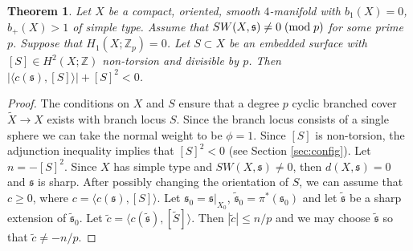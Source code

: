 \documentclass{amsart}
\newtheorem{theorem}{Theorem}[section]
\theoremstyle{definition}
\theoremstyle{remark}
\numberwithin{equation}{section}
\begin{document}
\begin{theorem}\label{thm:1sad}
Let $X$ be a compact, oriented, smooth $4$-manifold with $b_1(X) = 0$, $b_+(X) > 1$ of simple type. Assume that $SW(X , \mathfrak{s}) \neq 0 \; ({\rm mod} \; p)$ for some prime $p$. Suppose that $H_1(X ; \mathbb{Z}_p) = 0$. Let $S \subset X$ be an embedded surface with $[S] \in H^2(X ; \mathbb{Z})$ non-torsion and divisible by $p$. Then $| \langle c(\mathfrak{s}) , [S] \rangle | + [S]^2 < 0$.
\end{theorem}
\begin{proof}
The conditions on $X$ and $S$ ensure that a degree $p$ cyclic branched cover $\widetilde{X} \to X$ exists with branch locus $S$. Since the branch locus consists of a single sphere we can take the normal weight to be $\phi = 1$. Since $[S]$ is non-torsion, the adjunction inequality implies that $[S]^2 < 0$ (see Section \ref{sec:config}). Let $n = -[S]^2$. Since $X$ has simple type and $SW(X , \mathfrak{s}) \neq 0$, then $d(X , \mathfrak{s}) = 0$ and $\mathfrak{s}$ is sharp. After possibly changing the orientation of $S$, we can assume that $c \ge 0$, where $c = \langle c(\mathfrak{s}) , [S] \rangle$. Let $\mathfrak{s}_0 = \mathfrak{s}|_{X_0}$, $\widetilde{\mathfrak{s}}_0 = \pi^*( \mathfrak{s}_0)$ and let $\widetilde{\mathfrak{s}}$ be a sharp extension of $\widetilde{\mathfrak{s}}_0$. Let $\widetilde{c} = \langle c(\widetilde{\mathfrak{s}}) , [\widetilde{S}] \rangle$. Then $| \widetilde{c} | \le n/p$ and we may choose $\widetilde{\mathfrak{s}}$ so that $\widetilde{c} \neq -n/p$.


\end{proof}
\end{document}
